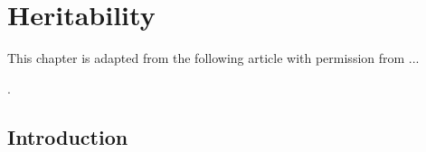 \chapter{Heritability} \label{chap:heritability}




\begin{singlespace}         %
    This chapter is adapted from the following article with permission from ...
    
    . 
\end{singlespace} 


\section{Introduction}
